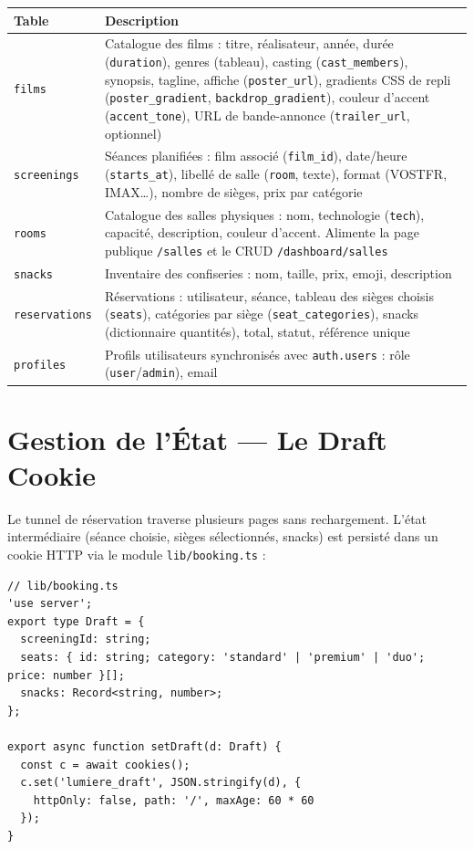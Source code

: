 \documentclass[12pt,a4paper,openany]{report}
\begin{document}
\begin{longtable}{lp{9cm}}
  \toprule
  \textbf{Table} & \textbf{Description} \\
  \midrule
  \endhead
  \bottomrule
  \endfoot
  \texttt{films}        & Catalogue des films : titre, réalisateur, année, durée (\texttt{duration}), genres (tableau), casting (\texttt{cast\_members}), synopsis, tagline, affiche (\texttt{poster\_url}), gradients CSS de repli (\texttt{poster\_gradient}, \texttt{backdrop\_gradient}), couleur d'accent (\texttt{accent\_tone}), URL de bande-annonce (\texttt{trailer\_url}, optionnel) \\
  \texttt{screenings}   & Séances planifiées : film associé (\texttt{film\_id}), date/heure (\texttt{starts\_at}), libellé de salle (\texttt{room}, texte), format (VOSTFR, IMAX…), nombre de sièges, prix par catégorie \\
  \texttt{rooms}        & Catalogue des salles physiques : nom, technologie (\texttt{tech}), capacité, description, couleur d'accent. Alimente la page publique \texttt{/salles} et le CRUD \texttt{/dashboard/salles} \\
  \texttt{snacks}       & Inventaire des confiseries : nom, taille, prix, emoji, description \\
  \texttt{reservations} & Réservations : utilisateur, séance, tableau des sièges choisis (\texttt{seats}), catégories par siège (\texttt{seat\_categories}), snacks (dictionnaire quantités), total, statut, référence unique \\
  \texttt{profiles}     & Profils utilisateurs synchronisés avec \texttt{auth.users} : rôle (\texttt{user}/\texttt{admin}), email \\
\end{longtable}

\section{Gestion de l'État — Le Draft Cookie}

Le tunnel de réservation traverse plusieurs pages sans rechargement. L'état intermédiaire (séance choisie, sièges sélectionnés, snacks) est persisté dans un cookie HTTP via le module \texttt{lib/booking.ts} :

\begin{lstlisting}
// lib/booking.ts
'use server';
export type Draft = {
  screeningId: string;
  seats: { id: string; category: 'standard' | 'premium' | 'duo'; price: number }[];
  snacks: Record<string, number>;
};

export async function setDraft(d: Draft) {
  const c = await cookies();
  c.set('lumiere_draft', JSON.stringify(d), {
    httpOnly: false, path: '/', maxAge: 60 * 60
  });
}
\end{lstlisting}
\end{document}
